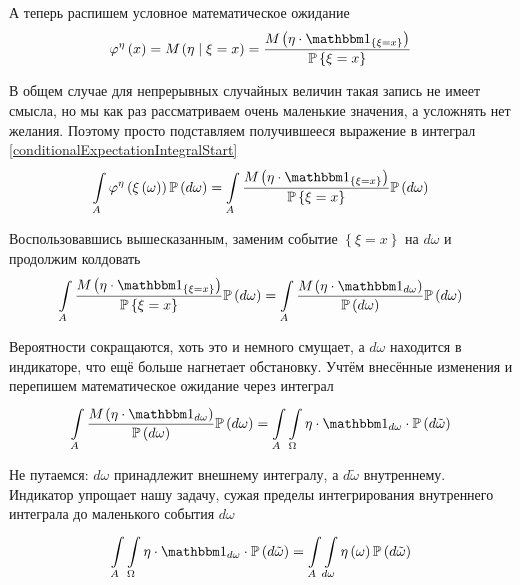 А теперь распишем условное математическое ожидание
$$\varphi^{\eta}\left( x \right)
    = \mean{\left( \eta \mid \xi = x \right)}
    = \frac{\mean{\left( \eta
        \cdot \indicatorof{\left\{ \xi = x \right\}} \right)}}
        {\Probability{\xi = x}}$$

В общем случае для непрерывных случайных величин такая запись не имеет смысла,
но мы как раз рассматриваем очень маленькие значения,
а усложнять нет желания.
Поэтому просто подставляем получившееся выражение
в интеграл \eqref{conditionalExpectationIntegralStart}
$$\integralc{A}{}{\probability{d\omega}}{
    \varphi^{\eta}\left( \xi\left( \omega \right) \right)}
    = \integralc{A}{}{\probability{d\omega}}{
        \frac{\mean{\left( \eta
            \cdot \indicatorof{\left\{ \xi = x \right\}} \right)}}
            {\Probability{\xi = x}}}$$

Воспользовавшись вышесказанным, заменим событие $\left\{ \xi = x \right\}$
на $d\omega$ и продолжим колдовать
$$\integralc{A}{}{\probability{d\omega}}{
        \frac{\mean{\left( \eta
            \cdot \indicatorof{\left\{ \xi = x \right\}} \right)}}
            {\Probability{\xi = x}}}
    = \integralc{A}{}{\probability{d\omega}}{
        \frac{\mean{\left( \eta \cdot \indicatorof{d\omega} \right)}}
            {\probability{d\omega}}}$$

Вероятности сокращаются, хоть это и немного смущает,
а $d\omega$ находится в индикаторе, что ещё больше нагнетает обстановку.
Учтём внесённые изменения и перепишем математическое ожидание через интеграл
$$\integralc{A}{}{\probability{d\omega}}{
    \frac{\mean{\left( \eta \cdot \indicatorof{d\omega} \right)}}
        {\probability{d\omega}}}
    = \int\limits_A \integralc{\Omega}{}{\probability{d\tilde{\omega}}}{
        \eta \cdot \indicatorof{d\omega} \cdot}$$

Не путаемся: $d\omega$ принадлежит внешнему интегралу,
а $d\tilde{\omega}$ внутреннему.
Индикатор упрощает нашу задачу,
сужая пределы интегрирования внутреннего интеграла
до маленького события $d\omega$
$$\int\limits_A \integralc{\Omega}{}{\probability{d\tilde{\omega}}}{
    \eta \cdot \indicatorof{d\omega} \cdot}
    = \int\limits_A \integralc{d\omega}{}{\probability{d\tilde{\omega}}}{
        \eta\left( \omega \right)}$$

